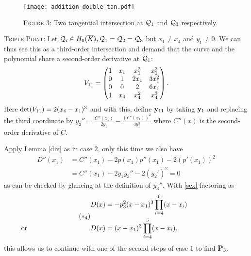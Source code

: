 \documentclass[english,11pt,a4paper]{article}
\begin{document}
\begin{figure}[ht]
  \fline
  \begin{center}
    \vspace{1mm}
    \texttt{[image: addition\_double\_tan.pdf]}

    {\scshape Figure 3}: Two tangential intersection at $\q_1$ and $\q_3$ respectively.%
  \end{center}
  \vspace{-1.5mm}
  \fline
\end{figure}

\begin{case}
  {\scshape Triple Point:} Let $\q_i \in \enkb , \q_1=\q_2=\q_3$ but $x_1 \neq x_4$ and $y_1 \neq 0$. We can thus see this as a third-order intersection and demand that the curve and the polynomial share a second-order derivative at $\q_1$:
  \begin{align*}\Vtri=
      \begin{pmatrix}
      1 & x_1 & x_1^2 & x_1^3\\
      0 & 1 & 2 x_1 & 3 x_1^2\\
      0 & 0 & 2 & 6x_1\\
      1 & x_4 & x_4^2 & x_4^3\\
    \end{pmatrix}.
  \end{align*}
  Here $\det(\Vtri)=2(x_4-x_1)^3$ and with this, define $\ytri$ by taking $\ydoub$ and replacing the third coordinate by $y_3'' = \frac{C''(x_1)}{2y_1}-\frac{(C'(x_1))^2}{4y_1^3}$ where $C''(x)$ is the second-order derivative of $C$.

  Apply Lemma \ref{div} as in case 2, only this time we also have
  \begin{align*}
    D''(x_1) &= C''(x_1) - 2 p(x_1)p''(x_1) - 2 (p'(x_1))^2\\
             &= C''(x_1) - 2 y_1 y_3''- 2(y_2')^2 = 0
  \end{align*}
  as can be checked by glancing at the definition of $y_3''$. With \eqref{sex} factoring as
  \begin{align} \tag{$*_4$} \begin{split}
    D(x) &= -p_3^2(x-x_1)^3 \prod_{i=4}^6(x-x_i) \\
    \rlap{\hspace{-37mm} or}
    D(x) &= (x-x_1)^3 \prod_{i=4}^5(x-x_i),
  \end{split} \end{align}
  this allows us to continue with one of the second steps of case 1 to find $\P_3$.
\end{case}
\end{document}
